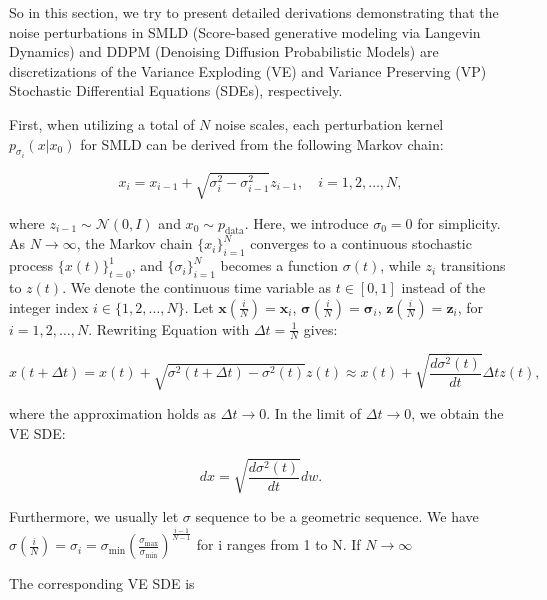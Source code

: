 So in this section, we try to present detailed derivations demonstrating that the noise perturbations in SMLD (Score-based generative modeling via Langevin Dynamics) and DDPM (Denoising Diffusion Probabilistic Models) are discretizations of the Variance Exploding (VE) and Variance Preserving (VP) Stochastic Differential Equations (SDEs), respectively. 

First, when utilizing a total of \( N \) noise scales, each perturbation kernel \( p_{\sigma_i}(x | x_0) \) for SMLD can be derived from the following Markov chain:

\begin{equation}
x_i = x_{i-1} + \sqrt{\sigma_i^2 - \sigma_{i-1}^2} z_{i-1}, \quad i = 1, 2, \ldots, N,
\end{equation}

\noindent
where \( z_{i-1} \sim \mathcal{N}(0, I) \) and \( x_0 \sim p_{\text{data}} \). Here, we introduce \( \sigma_0 = 0 \) for simplicity. As \( N \to \infty \), the Markov chain \( \{ x_i \}_{i=1}^N \) converges to a continuous stochastic process \( \{ x(t) \}_{t=0}^1 \), and \( \{ \sigma_i \}_{i=1}^N \) becomes a function \( \sigma(t) \), while \( z_i \) transitions to \( z(t) \). We denote the continuous time variable as \( t \in [0, 1] \) instead of the integer index \( i \in \{ 1, 2, \ldots, N \} \). Let $\mathbf{x} ( \frac{i}{N} ) = \mathbf{x}_i$, $\mathbf{\sigma} ( \frac{i}{N} ) = \mathbf{\sigma}_i$, $\mathbf{z} ( \frac{i}{N} ) = \mathbf{z}_i$, for $i = 1, 2, \ldots, N$. 
Rewriting Equation  with $\Delta t = \frac{1}{N}$ gives:
 
\begin{equation}
x(t + \Delta t) = x(t) + \sqrt{\sigma^2(t + \Delta t) - \sigma^2(t)} z(t) \approx x(t) + \sqrt{\frac{d \sigma^2(t)}{dt}} \Delta t z(t),
\end{equation}

\noindent
where the approximation holds as \( \Delta t \to 0 \). In the limit of \( \Delta t \to 0 \), we obtain the VE SDE:

\begin{equation}
dx = \sqrt{\frac{d \sigma^2(t)}{dt}} dw.
\end{equation}

\noindent
Furthermore, we usually let $\sigma$ sequence to be a geometric sequence. We have $\sigma (\frac{i}{N}) = \sigma_i = \sigma_{\min} (\frac{\sigma_{\max}}{\sigma_{\min}})^{\frac{i-1}{N-1}}$ for i ranges from 1 to N. If \( N \to \infty \)

\noindent
The corresponding VE SDE is 

